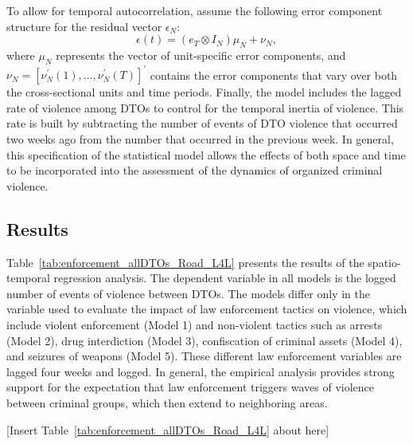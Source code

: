 \documentclass[12pt,letterpaper]{article}
\begin{document}
To allow for temporal autocorrelation, assume the following error component structure for the residual vector $\epsilon_{N}$:
\begin{equation}
    \epsilon(t) = (e_{T} \otimes I_{N})\mu_{N}+\nu_{N},
    \label{eqn:termp_dist_spatial_model}
\end{equation}
where $\mu_{N}$ represents the vector of unit-specific error components, and $\nu_{N}=[\nu^{\prime}_{N}(1),\dots,\nu^{\prime}_{N}(T)]^{\prime}$ contains the error components that vary over both the cross-sectional units and time periods. Finally, the model includes the lagged rate of violence among DTOs to control for the temporal inertia of violence. This rate is built by subtracting the number of events of DTO violence that occurred two weeks ago from the number that occurred in the previous week. In general, this specification of the statistical model allows the effects of both space and time to be incorporated into the assessment of the dynamics of organized criminal violence. 
   
 
 

\subsection*{Results}

Table~\ref{tab:enforcement_allDTOs_Road_L4L} presents the results of the spatio-temporal regression analysis. The dependent variable in all models is the logged number of events of violence between DTOs. The models differ only in the variable used to evaluate the impact of law enforcement tactics on violence, which include violent enforcement (Model 1) and non-violent tactics such as arrests (Model 2), drug interdiction (Model 3), confiscation of criminal assets (Model 4), and seizures of weapons (Model 5). These different law enforcement variables are lagged four weeks and logged. In general, the empirical analysis provides strong support for the expectation that law enforcement triggers waves of violence between criminal groups, which then extend to neighboring areas.

\begin{center}
   [Insert Table~\ref{tab:enforcement_allDTOs_Road_L4L} about here]
\end{center}
\end{document}
